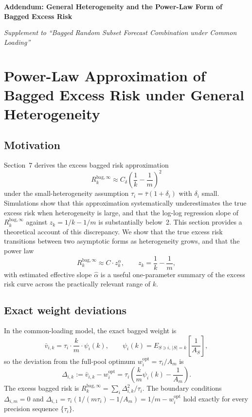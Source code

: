 \documentclass[12pt]{article}
\theoremstyle{definition}
\begin{document}
\noindent\textbf{\Large Addendum: General Heterogeneity and the Power-Law Form of Bagged Excess Risk}

\bigskip
\noindent\textit{Supplement to ``Bagged Random Subset Forecast Combination under Common Loading''}

\bigskip

\section{Power-Law Approximation of Bagged Excess Risk under General Heterogeneity}

\subsection{Motivation}

Section~7 derives the excess bagged risk approximation
\begin{equation}
  R_k^{\mathrm{bag},\infty} \approx C_\delta\!\left(\frac{1}{k}-\frac{1}{m}\right)^{\!2}
\end{equation}
under the small-heterogeneity assumption $\tau_i = \bar\tau(1+\delta_i)$ with $\delta_i$ small.
Simulations show that this approximation systematically underestimates the true excess risk
when heterogeneity is large, and that the log-log regression slope of $R_k^{\mathrm{bag},\infty}$
against $z_k = 1/k - 1/m$ is substantially below~2.
This section provides a theoretical account of this discrepancy.
We show that the true excess risk transitions between two asymptotic forms as heterogeneity
grows, and that the power law
\begin{equation}
  R_k^{\mathrm{bag},\infty} \approx C \cdot z_k^\alpha, \qquad z_k = \frac{1}{k} - \frac{1}{m},
\end{equation}
with estimated effective slope $\hat\alpha$ is a useful one-parameter summary of the excess
risk curve across the practically relevant range of $k$.

\subsection{Exact weight deviations}

In the common-loading model, the exact bagged weight is
\[
  \bar v_{i,k} = \tau_i \cdot \frac{k}{m} \cdot \psi_i(k),
  \qquad
  \psi_i(k) = E_{S \ni i,\, |S|=k}\!\left[\frac{1}{A_S}\right],
\]
so the deviation from the full-pool optimum $w_i^{\mathrm{opt}} = \tau_i/A_m$ is
\begin{equation}
  \Delta_{i,k} := \bar v_{i,k} - w_i^{\mathrm{opt}} = \tau_i\!\left(\frac{k}{m}\psi_i(k) - \frac{1}{A_m}\right).
\end{equation}
The excess bagged risk is $R_k^{\mathrm{bag},\infty} = \sum_i \Delta_{i,k}^2/\tau_i$.
The boundary conditions $\Delta_{i,m}=0$ and $\Delta_{i,1} = \tau_i(1/(m\tau_i) - 1/A_m) = 1/m - w_i^{\mathrm{opt}}$
hold exactly for every precision sequence $\{\tau_i\}$.
\end{document}
